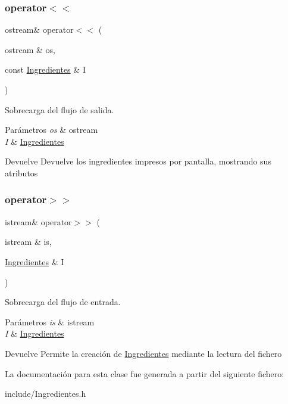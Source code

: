 \subsubsection{\texorpdfstring{operator$<$$<$}{operator<<}}
{\footnotesize\ttfamily ostream\& operator$<$$<$ (\begin{DoxyParamCaption}\item[{ostream \&}]{os,  }\item[{const \hyperlink{classIngredientes}{Ingredientes} \&}]{I }\end{DoxyParamCaption})\hspace{0.3cm}{\ttfamily [friend]}}



Sobrecarga del flujo de salida. 


\begin{DoxyParams}{Parámetros}
{\em os} & ostream \\
\hline
{\em I} & \hyperlink{classIngredientes}{Ingredientes} \\
\hline
\end{DoxyParams}
\begin{DoxyReturn}{Devuelve}
Devuelve los ingredientes impresos por pantalla, mostrando sus atributos 
\end{DoxyReturn}
\mbox{\label{classIngredientes_afa2cabeefdee6cf26890ffd55bb3a7f3}} 
\subsubsection{\texorpdfstring{operator$>$$>$}{operator>>}}
{\footnotesize\ttfamily istream\& operator$>$$>$ (\begin{DoxyParamCaption}\item[{istream \&}]{is,  }\item[{\hyperlink{classIngredientes}{Ingredientes} \&}]{I }\end{DoxyParamCaption})\hspace{0.3cm}{\ttfamily [friend]}}



Sobrecarga del flujo de entrada. 


\begin{DoxyParams}{Parámetros}
{\em is} & istream \\
\hline
{\em I} & \hyperlink{classIngredientes}{Ingredientes} \\
\hline
\end{DoxyParams}
\begin{DoxyReturn}{Devuelve}
Permite la creación de \hyperlink{classIngredientes}{Ingredientes} mediante la lectura del fichero 
\end{DoxyReturn}


La documentación para esta clase fue generada a partir del siguiente fichero\+:\begin{DoxyCompactItemize}
\item 
include/Ingredientes.\+h\end{DoxyCompactItemize}
